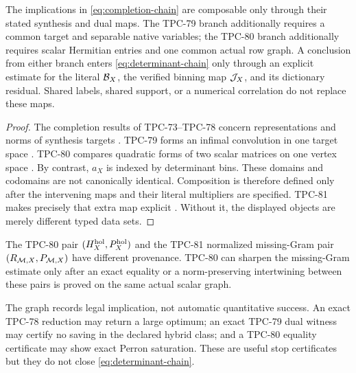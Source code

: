 \begin{theorem}
\label{thm:typed-dependency}
The implications in \eqref{eq:completion-chain} are composable only
through their stated synthesis and dual maps.  The TPC-79 branch
additionally requires a common target and separable native variables;
the TPC-80 branch additionally requires scalar Hermitian entries and
one common actual row graph.  A conclusion from either branch enters
\eqref{eq:determinant-chain} only through an explicit estimate for the
literal \(\mathcal B_X\), the verified binning map \(\mathcal J_X\), and its
dictionary residual.  Shared labels, shared support, or a numerical
correlation do not replace these maps.
\end{theorem}

\begin{proof}
The completion results of TPC-73--TPC-78 concern representations and
norms of synthesis targets
\citep{WangTPC73,WangTPC74,WangTPC75,WangTPC76,WangTPC77,WangTPC78}.
TPC-79 forms an infimal convolution in one target space
\citep{WangTPC79}.  TPC-80 compares quadratic forms of two scalar
matrices on one vertex space \citep{WangTPC80}.  By contrast,
\(a_X\) is indexed by determinant bins.  These domains and codomains
are not canonically identical.  Composition is therefore defined
only after the intervening maps and their literal multipliers are
specified.  TPC-81 makes precisely that extra map explicit
\citep{WangTPC81}.  Without it, the displayed objects are merely
different typed data sets.
\end{proof}

\begin{remark}
The TPC-80 pair
\((H_X^{\rm hol},P_X^{\rm hol})\) and the TPC-81 normalized
missing-Gram pair \((R_{\mathcal M,X},P_{\mathcal M,X})\) have different
provenance.  TPC-80 can sharpen the missing-Gram estimate only after
an exact equality or a norm-preserving intertwining between these
pairs is proved on the same actual scalar graph.
\end{remark}

\begin{remark}
The graph records legal implication, not automatic quantitative
success.  An exact TPC-78 reduction may return a large optimum; an
exact TPC-79 dual witness may certify no saving in the declared
hybrid class; and a TPC-80 equality certificate may show exact Perron
saturation.  These are useful stop certificates but they do not close
\eqref{eq:determinant-chain}.
\end{remark}
